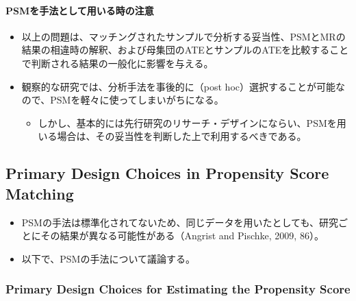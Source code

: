 \paragraph{PSMを手法として用いる時の注意}

\begin{itemize}
 \item 以上の問題は、マッチングされたサンプルで分析する妥当性、PSMとMRの結果の相違時の解釈、および母集団のATEとサンプルのATEを比較することで判断される結果の一般化に影響を与える。
 \item 観察的な研究では、分析手法を事後的に（post hoc）選択することが可能なので、PSMを軽々に使ってしまいがちになる。
       \begin{itemize}
        \item しかし、基本的には先行研究のリサーチ・デザインにならい、PSMを用いる場合は、その妥当性を判断した上で利用するべきである。
       \end{itemize}
\end{itemize}

\subsection*{Primary Design Choices in Propensity Score Matching}

\begin{itemize}
 \item PSMの手法は標準化されてないため、同じデータを用いたとしても、研究ごとにその結果が異なる可能性がある（Angrist and Pischke, 2009, 86）。
 \item 以下で、PSMの手法について議論する。
\end{itemize}

\subsubsection*{Primary Design Choices for Estimating the Propensity Score}

